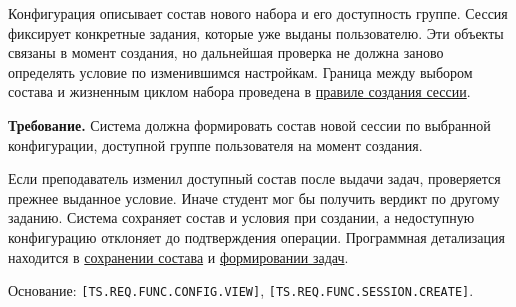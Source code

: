 \documentclass[12pt,a4paper]{article}
\begin{document}
\hypertarget{sr-sys-003-согласованный-состав-набора}{}

Конфигурация описывает состав нового набора и его доступность группе. Сессия фиксирует конкретные задания, которые уже выданы пользователю. Эти объекты связаны в момент создания, но дальнейшая проверка не должна заново определять условие по изменившимся настройкам. Граница между выбором состава и жизненным циклом набора проведена в \hyperref[sr-ses-001-ux441ux43eux437ux434ux430ux43dux438ux435-ux43dux430ux431ux43eux440ux430-ux43fux43e-ux43aux43eux43dux444ux438ux433ux443ux440ux430ux446ux438ux438-ux433ux440ux443ux43fux43fux44b]{правиле создания сессии}.

\textbf{Требование.} Система должна формировать состав новой сессии по выбранной конфигурации, доступной группе пользователя на момент создания.

Если преподаватель изменил доступный состав после выдачи задач, проверяется прежнее выданное условие. Иначе студент мог бы получить вердикт по другому заданию. Система сохраняет состав и условия при создании, а недоступную конфигурацию отклоняет до подтверждения операции. Программная детализация находится в \href{../07_\%D0\%9F\%D1\%80\%D0\%BE\%D0\%B3\%D1\%80\%D0\%B0\%D0\%BC\%D0\%BC\%D0\%BD\%D1\%8B\%D0\%B5_\%D1\%82\%D1\%80\%D0\%B5\%D0\%B1\%D0\%BE\%D0\%B2\%D0\%B0\%D0\%BD\%D0\%B8\%D1\%8F/DOC-06_\%D0\%9F\%D1\%80\%D0\%BE\%D0\%B3\%D1\%80\%D0\%B0\%D0\%BC\%D0\%BC\%D0\%BD\%D1\%8B\%D0\%B5_\%D1\%82\%D1\%80\%D0\%B5\%D0\%B1\%D0\%BE\%D0\%B2\%D0\%B0\%D0\%BD\%D0\%B8\%D1\%8F.pdf\#nameddest=swr-sys-003-\%D1\%81\%D0\%BE\%D1\%81\%D1\%82\%D0\%B0\%D0\%B2-\%D1\%81\%D0\%BE\%D0\%B7\%D0\%B4\%D0\%B0\%D0\%BD\%D0\%BD\%D0\%BE\%D0\%B9-\%D1\%81\%D0\%B5\%D1\%81\%D1\%81\%D0\%B8\%D0\%B8}{сохранении состава} и \href{../07_\%D0\%9F\%D1\%80\%D0\%BE\%D0\%B3\%D1\%80\%D0\%B0\%D0\%BC\%D0\%BC\%D0\%BD\%D1\%8B\%D0\%B5_\%D1\%82\%D1\%80\%D0\%B5\%D0\%B1\%D0\%BE\%D0\%B2\%D0\%B0\%D0\%BD\%D0\%B8\%D1\%8F/DOC-06.2_\%D0\%A1\%D0\%B5\%D1\%81\%D1\%81\%D0\%B8\%D0\%B8_\%D0\%B7\%D0\%B0\%D0\%B4\%D0\%B0\%D1\%87_\%D0\%B8_\%D0\%BF\%D0\%BB\%D0\%B0\%D0\%BD\%D0\%B8\%D1\%80\%D0\%BE\%D0\%B2\%D1\%89\%D0\%B8\%D0\%BA.pdf\#nameddest=swr-ses-004-\%D1\%84\%D0\%BE\%D1\%80\%D0\%BC\%D0\%B8\%D1\%80\%D0\%BE\%D0\%B2\%D0\%B0\%D0\%BD\%D0\%B8\%D0\%B5-\%D0\%B7\%D0\%B0\%D0\%B4\%D0\%B0\%D1\%87}{формировании задач}.

Основание: \texttt{[TS.\allowbreak{}REQ.\allowbreak{}FUNC.\allowbreak{}CONFIG.\allowbreak{}VIEW]}, \texttt{[TS.\allowbreak{}REQ.\allowbreak{}FUNC.\allowbreak{}SESSION.\allowbreak{}CREATE]}.
\end{document}
